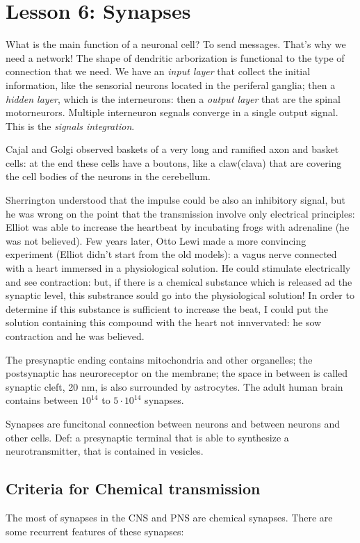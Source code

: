 \documentclass[a4paper, 12pt]{book}
\begin{document}
\chapter{Lesson 6: Synapses}

What is the main function of a neuronal cell? To send messages. That's why we need a network! The shape of dendritic arborization is functional to the type of connection that we need.  We have an \emph{input layer} that collect the initial information, like the sensorial neurons located in the periferal ganglia; then a \emph{hidden layer}, which is the interneurons: then a \emph{output layer} that are the spinal motorneurors. Multiple interneuron segnals converge in a single output signal. This is the \emph{signals integration}.

Cajal and Golgi observed baskets of a very long and ramified axon and basket cells: at the end these cells have a boutons, like a claw(clava) that are covering the cell bodies of the neurons in the cerebellum. 

Sherrington understood that the impulse could be also an inhibitory signal, but he was wrong on the point that the transmission involve only electrical principles: Elliot was able to increase the heartbeat by incubating frogs with adrenaline (he was not believed). Few years later, Otto Lewi made a more convincing experiment (Elliot didn't start from the old models): a vagus nerve connected with a heart immersed in a physiological solution. He could stimulate electrically and  see contraction: but, if there is a chemical substance which is released ad the synaptic level, this substrance sould go into the physiological solution! In order to determine if this substance is sufficient to increase the beat, I could put the solution containing this compound with the heart not innvervated: he sow contraction and he was believed.

The presynaptic ending contains mitochondria and other organelles; the postsynaptic has neuroreceptor on the membrane; the space in between is called synaptic cleft, 20 nm, is also surrounded by astrocytes. The adult human brain contains between $10^{14}$ to $5 \cdot 10^{14}$ synapses. 

Synapses are funcitonal connection between neurons and between neurons and other cells.  Def: a presynaptic terminal that is able to synthesize a neurotransmitter, that is contained in vesicles.

\section{Criteria for Chemical transmission}
The most of synapses in the CNS and PNS are chemical synapses. There are some recurrent features of these synapses:
\end{document}
